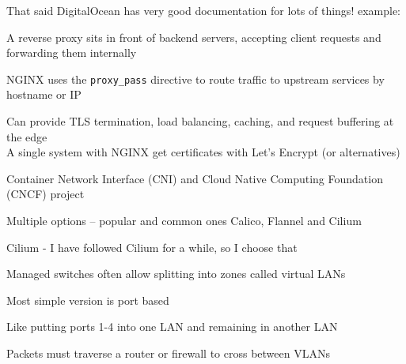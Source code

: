 \documentclass[Screen16to9,17pt]{foils}
\begin{document}
That said DigitalOcean has very good documentation for lots of things! example:\\



\begin{list2}
\item A reverse proxy sits in front of backend servers, accepting client requests and forwarding them internally
\item NGINX uses the \verb+proxy_pass+ directive to route traffic to upstream services by hostname or IP
\item Can provide TLS termination, load balancing, caching, and request buffering at the edge\\
A single system with NGINX get certificates with Let's Encrypt (or alternatives)
\end{list2}






\begin{list2}
\item Container Network Interface (CNI) and Cloud Native Computing Foundation (CNCF) project\\
\item Multiple options -- popular and common ones Calico, Flannel and Cilium
\item Cilium - I have followed Cilium for a while, so I choose that
\end{list2}




\begin{list1}
\item Managed switches often allow splitting into zones called virtual LANs
\item Most simple version is port based
\item Like putting ports 1-4 into one LAN and remaining in another LAN
\item Packets must traverse a router or firewall to cross between VLANs
\end{list1}
\end{document}
